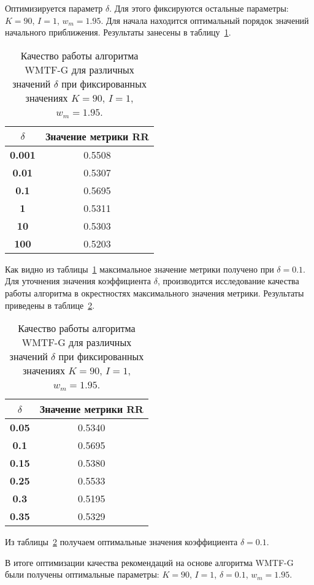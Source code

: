     Оптимизируется параметр $\delta$. Для этого фиксируются остальные параметры: $K=90$, $I=1$, $w_m=1.95$.
    Для начала находится оптимальный порядок значений начального приближения. Результаты занесены в таблицу~\ref{tabular:wtmfg_test1}.
    \begin{table}[ht!]
        \caption{Качество работы алгоритма WMTF-G для различных значений $\delta$ при фиксированных значениях $K=90$, $I=1$, $w_m=1.95$. \bigskip}
        \centering

        \label{tabular:wtmfg_test1}
        \begin{tabular}{|c|c|} \hline
            $\delta$ & \bf{Значение метрики RR} \\ \hline
            \bf{0.001} & 0.5508 \\ \hline
            \bf{0.01} & 0.5307 \\ \hline
            \bf{0.1} & 0.5695 \\ \hline
            \bf{1} & 0.5311 \\ \hline
            \bf{10} & 0.5303 \\ \hline
            \bf{100} & 0.5203 \\ \hline
        \end{tabular}
    \end{table}
    Как видно из таблицы~\ref{tabular:wtmfg_test1} максимальное значение метрики получено при $\delta=0.1$.
    Для уточнения значения коэффициента $\delta$, производится исследование качества работы алгоритма в окрестностях максимального значения метрики.
    Результаты приведены в таблице~\ref{tabular:wtmfg_test2}.
    \begin{table}[ht!]
        \caption{Качество работы алгоритма WMTF-G для различных значений $\delta$ при фиксированных значениях $K=90$, $I=1$, $w_m=1.95$. \bigskip}
        \centering

        \label{tabular:wtmfg_test2}
        \begin{tabular}{|c|c|} \hline
            $\delta$ & \bf{Значение метрики RR} \\ \hline
            \bf{0.05} & 0.5340 \\ \hline
            \bf{0.1} & 0.5695 \\ \hline
            \bf{0.15} & 0.5380 \\ \hline
            \bf{0.25} & 0.5533 \\ \hline
            \bf{0.3} & 0.5195 \\ \hline
            \bf{0.35} & 0.5329 \\ \hline
        \end{tabular}
    \end{table}
    Из таблицы~\ref{tabular:wtmfg_test2} получаем оптимальные значения коэффициента $\delta=0.1$.

    В итоге оптимизации качества рекомендаций на основе алгоритма WMTF-G были получены оптимальные параметры:
    $K=90$, $I=1$, $\delta=0.1$, $w_m=1.95$.